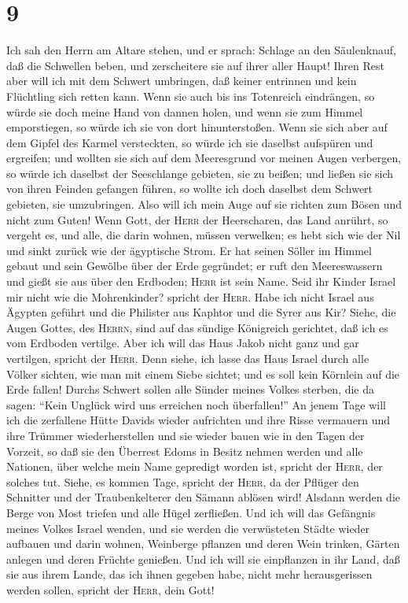 \hypertarget{section-8}{%
\section{9}\label{section-8}}

 Ich sah den Herrn am Altare stehen, und er sprach:
Schlage an den Säulenknauf, daß die Schwellen beben, und zerscheitere
sie auf ihrer aller Haupt! Ihren Rest aber will ich mit dem Schwert
umbringen, daß keiner entrinnen und kein Flüchtling sich retten kann.
 Wenn sie auch bis ins Totenreich eindrängen, so würde sie
doch meine Hand von dannen holen, und wenn sie zum Himmel emporstiegen,
so würde ich sie von dort hinunterstoßen.  Wenn sie sich
aber auf dem Gipfel des Karmel versteckten, so würde ich sie daselbst
aufspüren und ergreifen; und wollten sie sich auf dem Meeresgrund vor
meinen Augen verbergen, so würde ich daselbst der Seeschlange gebieten,
sie zu beißen;  und ließen sie sich von ihren Feinden
gefangen führen, so wollte ich doch daselbst dem Schwert gebieten, sie
umzubringen. Also will ich mein Auge auf sie richten zum Bösen und nicht
zum Guten!  Wenn Gott, der \textsc{Herr} der Heerscharen,
das Land anrührt, so vergeht es, und alle, die darin wohnen, müssen
verwelken; es hebt sich wie der Nil und sinkt zurück wie der ägyptische
Strom.  Er hat seinen Söller im Himmel gebaut und sein
Gewölbe über der Erde gegründet; er ruft den Meereswassern und gießt sie
aus über den Erdboden; \textsc{Herr} ist sein Name.  Seid
ihr Kinder Israel mir nicht wie die Mohrenkinder? spricht der
\textsc{Herr}. Habe ich nicht Israel aus Ägypten geführt und die
Philister aus Kaphtor und die Syrer aus Kir?  Siehe, die
Augen Gottes, des \textsc{Herrn}, sind auf das sündige Königreich
gerichtet, daß ich es vom Erdboden vertilge. Aber ich will das Haus
Jakob nicht ganz und gar vertilgen, spricht der \textsc{Herr}.
 Denn siehe, ich lasse das Haus Israel durch alle Völker
sichten, wie man mit einem Siebe sichtet; und es soll kein Körnlein auf
die Erde fallen!  Durchs Schwert sollen alle Sünder
meines Volkes sterben, die da sagen: ``Kein Unglück wird uns erreichen
noch überfallen!''  An jenem Tage will ich die zerfallene
Hütte Davids wieder aufrichten und ihre Risse vermauern und ihre Trümmer
wiederherstellen und sie wieder bauen wie in den Tagen der Vorzeit,
 so daß sie den Überrest Edoms in Besitz nehmen werden
und alle Nationen, über welche mein Name gepredigt worden ist, spricht
der \textsc{Herr}, der solches tut.  Siehe, es kommen
Tage, spricht der \textsc{Herr}, da der Pflüger den Schnitter und der
Traubenkelterer den Sämann ablösen wird! Alsdann werden die Berge von
Most triefen und alle Hügel zerfließen.  Und ich will das
Gefängnis meines Volkes Israel wenden, und sie werden die verwüsteten
Städte wieder aufbauen und darin wohnen, Weinberge pflanzen und deren
Wein trinken, Gärten anlegen und deren Früchte genießen. 
Und ich will sie einpflanzen in ihr Land, daß sie aus ihrem Lande, das
ich ihnen gegeben habe, nicht mehr herausgerissen werden sollen, spricht
der \textsc{Herr}, dein Gott!
